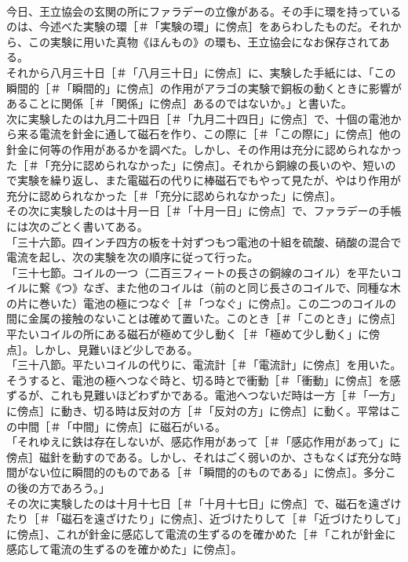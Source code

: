\documentclass[8pt]{extreport}
\begin{document}
\begin{CJK}{UTF8}{min}
\\	今日、王立協会の玄関の所にファラデーの立像がある。その手に環を持っているのは、今述べた実験の環［＃「実験の環」に傍点］をあらわしたものだ。それから、この実験に用いた真物《ほんもの》の環も、王立協会になお保存されてある。
\\	それから八月三十日［＃「八月三十日」に傍点］に、実験した手紙には、「この瞬間的［＃「瞬間的」に傍点］の作用がアラゴの実験で銅板の動くときに影響があることに関係［＃「関係」に傍点］あるのではないか。」と書いた。
\\	次に実験したのは九月二十四日［＃「九月二十四日」に傍点］で、十個の電池から来る電流を針金に通して磁石を作り、この際に［＃「この際に」に傍点］他の針金に何等の作用があるかを調べた。しかし、その作用は充分に認められなかった［＃「充分に認められなかった」に傍点］。それから銅線の長いのや、短いので実験を繰り返し、また電磁石の代りに棒磁石でもやって見たが、やはり作用が充分に認められなかった［＃「充分に認められなかった」に傍点］。
\\	その次に実験したのは十月一日［＃「十月一日」に傍点］で、ファラデーの手帳には次のごとく書いてある。
\\	「三十六節。四インチ四方の板を十対ずつもつ電池の十組を硫酸、硝酸の混合で電流を起し、次の実験を次の順序に従って行った。
\\	「三十七節。コイルの一つ（二百三フィートの長さの銅線のコイル）を平たいコイルに繋《つ》なぎ、また他のコイルは（前のと同じ長さのコイルで、同種な木の片に巻いた）電池の極につなぐ［＃「つなぐ」に傍点］。この二つのコイルの間に金属の接触のないことは確めて置いた。このとき［＃「このとき」に傍点］平たいコイルの所にある磁石が極めて少し動く［＃「極めて少し動く」に傍点］。しかし、見難いほど少しである。
\\	「三十八節。平たいコイルの代りに、電流計［＃「電流計」に傍点］を用いた。そうすると、電池の極へつなぐ時と、切る時とで衝動［＃「衝動」に傍点］を感ずるが、これも見難いほどわずかである。電池へつないだ時は一方［＃「一方」に傍点］に動き、切る時は反対の方［＃「反対の方」に傍点］に動く。平常はこの中間［＃「中間」に傍点］に磁石がいる。
\\	「それゆえに鉄は存在しないが、感応作用があって［＃「感応作用があって」に傍点］磁針を動すのである。しかし、それはごく弱いのか、さもなくば充分な時間がない位に瞬間的のものである［＃「瞬間的のものである」に傍点］。多分この後の方であろう。」
\\	その次に実験したのは十月十七日［＃「十月十七日」に傍点］で、磁石を遠ざけたり［＃「磁石を遠ざけたり」に傍点］、近づけたりして［＃「近づけたりして」に傍点］、これが針金に感応して電流の生ずるのを確かめた［＃「これが針金に感応して電流の生ずるのを確かめた」に傍点］。

\end{CJK}
\end{document}
